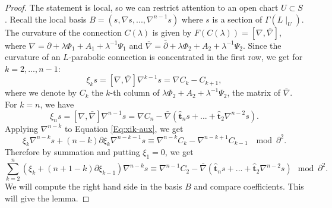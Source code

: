 \documentclass[11pt]{amsart}
\numberwithin{thm}{section} %
\numberwithin{equation}{section} %
\numberwithin{figure}{section} %
\renewcommand*{\S}{S}
\renewcommand*{\l}{\lambda}
\begin{document}
\begin{proof}
The statement is local, so we can restrict attention to an open chart $U\subset \S$. Recall the local basis $B=(s,\nabla s,...,\nabla^{n-1}s)$ where $s$ is a section of $\Gamma(L\!\mid_U)$. The curvature of the connection $C(\l)$ is given by $F(C(\l))=[\nabla,\bar\nabla]$, where $\nabla=\partial+\l\Phi_1+A_1+\l^{-1}\Psi_1$ and $\bar\nabla=\bar\partial+\l\Phi_2+A_2+\l^{-1}\Psi_2$. Since the curvature of an $L$-parabolic connection is concentrated in the first row, we get for $k=2,...,n-1$:
\begin{equation}\label{Eq:xik-aux}
\xi_k s = [\nabla,\bar\nabla]\nabla^{k-1}s = \nabla C_{k}-C_{k+1},
\end{equation}
where we denote by $C_k$ the $k$-th column of $\l\Phi_2+A_2+\l^{-1}\Psi_2$, the matrix of $\bar\nabla$. For $k=n$, we have 
$$\xi_n s=[\nabla,\bar\nabla]\nabla^{n-1}s=\nabla C_n-\bar\nabla(\bm\hat{t}_n s+...+\bm\hat{t}_2 \nabla^{n-2}s).$$ 
Applying $\nabla^{n-k}$ to Equation \eqref{Eq:xik-aux}, we get
$$\xi_k \nabla^{n-k}s+(n-k)\partial\xi_k \nabla^{n-k-1}s \equiv \nabla^{n-k}C_k-\nabla^{n-k+1}C_{k-1} \;\mod \partial^2.$$
Therefore by summation and putting $\xi_1=0$, we get
\begin{equation}\label{Eq:xi-eq-aux}
\sum_{k=2}^{n}(\xi_{k}+(n+1-k)\partial\xi_{k-1})\nabla^{n-k} s \equiv \nabla^{n-1}C_2-\bar\nabla(\bm\hat{t}_n s+...+\bm\hat{t}_2 \nabla^{n-2}s) \mod \partial^2.
\end{equation}
We will compute the right hand side in the basis $B$ and compare coefficients. This will give the lemma. 



\end{proof}
\end{document}
